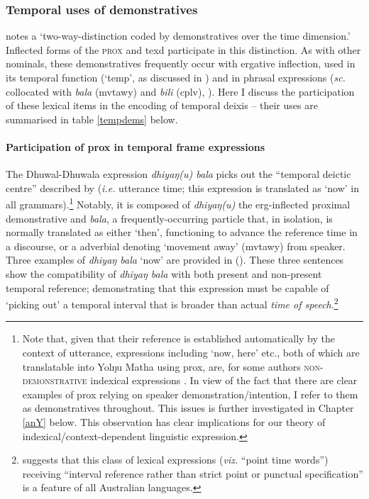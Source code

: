 \subsubsection{Temporal uses of demonstratives}

\citet[255\textit{ff}]{Wilkinson1991} notes a `two-way-distinction coded by demonstratives over the time dimension.' Inflected forms of the \textsc{prox} and \gls{texd} participate in this distinction. As with other nominals, these demonstratives frequently occur with ergative inflection, used in its temporal function (`\gls{temp}', as discussed in \citealp[131]{Wilkinson1991}) and in phrasal expressions (\textit{sc.} collocated with \textit{bala} (\gls{mvtawy}) and \textit{bili} (\gls{cplv}), \citealt[289\textit{ff}]{Wilkinson1991}). Here I discuss the participation of these lexical items in the encoding of temporal deixis -- their uses are summarised in table \ref{tempdems} below.

\paragraph{Participation of \gls{prox} in temporal frame expressions}
The Dhuwal-Dhuwala expression \textit{dhiyaŋ(u) bala} picks out the ``temporal deictic centre'' described by \citet{Austin1998} (\textit{i.e.} utterance time; this expression is translated as `now' in all grammars).\footnote{Note that, given that their reference is established automatically by the context of utterance, expressions including `now, here' etc., both of which are translatable into Yolŋu Matha using \gls{prox}, are, for some authors \textsc{non-demonstrative} indexical expressions \citep[e.g.][3]{Perry2012}. In view of the fact that there are clear examples of \gls{prox} relying on speaker demonstration/intention, I refer to them as demonstratives throughout. This issues is further investigated in Chapter \ref{anY} below. This observation has clear implications for our theory of indexical/context-dependent linguistic expression.} Notably, it is composed of \textit{dhiyaŋ(u)} the \gls{erg}-inflected proximal demonstrative and \textit{bala}, a frequently-occurring particle that, in isolation, is normally translated as either `then', functioning to advance the reference time in a discourse, or a adverbial denoting `movement away' (\gls{mvtawy}) from speaker. Three examples of \textit{dhiyaŋ bala} `now' are provided in (\nextx). These three sentences show the compatibility of \textit{dhiyaŋ bala} with both present and non-present temporal reference; demonstrating that this expression must be capable of `picking out' a temporal interval that is broader than actual \textit{time of speech}.\footnote{\citet[147]{Austin1998} suggests that this class of lexical expressions (\textit{viz.} ``point time words'') receiving ``interval reference rather than strict point or punctual specification'' is a feature of all Australian languages.}



